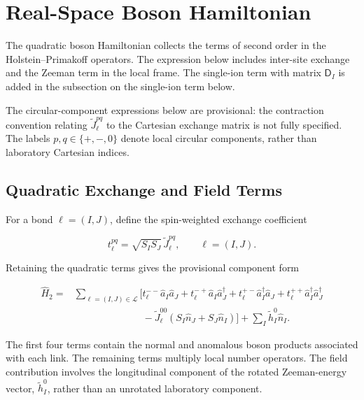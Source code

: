
\hypertarget{sec-lswt-real-space-boson-hamiltonian}{%
\section{Real-Space Boson Hamiltonian}\label{sec-lswt-real-space-boson-hamiltonian}}

The quadratic boson Hamiltonian collects the terms of second order in the Holstein--Primakoff operators. The expression below includes inter-site exchange and the Zeeman term in the local frame. The single-ion term with matrix \(\mathsf D_I\) is added in the subsection on the single-ion term below.

The circular-component expressions below are provisional: the contraction convention relating \(\widetilde J_\ell^{pq}\) to the Cartesian exchange matrix is not fully specified. The labels \(p,q\in\{+,-,0\}\) denote local circular components, rather than laboratory Cartesian indices.

\subsection{Quadratic Exchange and Field Terms}

For a bond \(\ell=(I,J)\), define the spin-weighted exchange coefficient

\[
t_\ell^{pq}=\sqrt{S_I S_J}\,\widetilde J_\ell^{pq},
\qquad \ell=(I,J).
\]

Retaining the quadratic terms gives the provisional component form

\[
\begin{aligned}
\hat H_2
=&\sum_{\ell=(I,J)\in\mathcal L}\Big[
t_\ell^{--}\hat a_I\hat a_J
+t_\ell^{-+}\hat a_I\hat a_J^\dagger
+t_\ell^{+-}\hat a_I^\dagger\hat a_J
+t_\ell^{++}\hat a_I^\dagger\hat a_J^\dagger
\\
&\hspace{7em}
-\widetilde J_\ell^{00}\left(S_I\hat n_J+S_J\hat n_I\right)
\Big]
+\sum_I\widetilde h_I^0\hat n_I.
\end{aligned}
\]

The first four terms contain the normal and anomalous boson products associated with each link. The remaining terms multiply local number operators. The field contribution involves the longitudinal component of the rotated Zeeman-energy vector, \(\widetilde h_I^0\), rather than an unrotated laboratory component.

